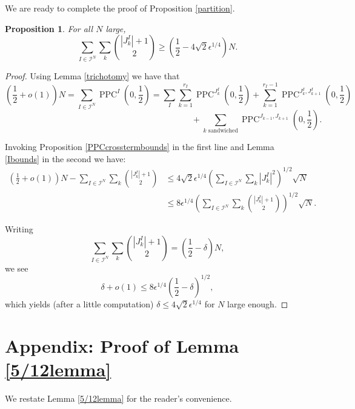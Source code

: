 \documentclass[12pt]{amsart}
\newtheorem{proposition}{Proposition}[section]
\theoremstyle{definition}
\newcommand{\vsss}{\vspace{6mm}}
\newcommand{\mc}{\mathcal}
\DeclareMathOperator{\PPC}{PPC}
\begin{document}
\vspace{1.5mm}

We are ready to complete the proof of Proposition \ref{partition}.

\begin{proposition}\label{sizeofintervalsbounds} 
For all $N$ large, $$\sum_{I \in \mc{I}^N}\sum_k \binom{|J_k^I|+1}{2} \geq  (\frac{1}{2}-4\sqrt{2}\epsilon^{1/4})N.$$
\end{proposition}

\begin{proof}
Using Lemma \ref{trichotomy} we have that 
$$(\frac{1}{2}+o(1))N = \sum_{I\in \mc I^N}\PPC^I(0,\frac{1}{2}) = \sum_I\sum_{k=1}^{r_I} \PPC^{J^I_k}(0,\frac{1}{2}) +\sum_{k=1}^{r_I-1}\PPC^{J^I_k,J^I_{k+1}}(0, \frac{1}{2})$$ $$\qquad \qquad \qquad \qquad \qquad \qquad \qquad \qquad \qquad \qquad \qquad + \sum_{k \text{ sandwiched}}\PPC^{J_{k-1},J_{k+1}}(0,\frac{1}{2}).$$ 

Invoking Proposition \ref{PPCcrosstermbounds} in the first line and Lemma \ref{Ibounds} in the second we have: \begin{align*}(\frac{1}{2}+o(1))N-\sum_{I \in \mc{I}^N}\sum_k \binom{|J_k^I|+1}{2} &\le 4\sqrt 2 \epsilon^{1/4}\left(\sum_{I \in \mc{I}^N} \sum_k |J_k^I|^2\right)^{1/2}\sqrt{N} \\
& \le  8\epsilon^{1/4}\left(\sum_{I \in \mc{I}^N} \sum_k \binom{|J_k^I|+1}{2}\right)^{1/2}\sqrt{N}.
\end{align*}

Writing $$\sum_{I \in \mc{I}^N} \sum_k \binom{|J_k^I|+1}{2} = (\frac{1}{2}-\delta) N,$$ we see $$\delta+o(1)\le 8 \epsilon^{1/4}(\frac{1}{2} - \delta)^{1/2},$$ which yields (after a little computation) $\delta \le 4\sqrt{2}\epsilon^{1/4}$ for $N$ large enough.
\end{proof}

\vspace{1.5mm}











\vsss

\section{Appendix: Proof of Lemma \ref{5/12lemma}}\label{appendix}

We restate Lemma \ref{5/12lemma} for the reader's convenience.
\end{document}
